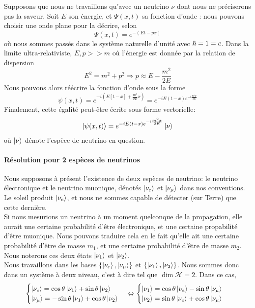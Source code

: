 \documentclass[../notesdecours.tex]{subfiles}
\begin{document}
Supposons que nous ne travaillons qu'avec un neutrino $\nu$ dont nous ne préciserons pas la saveur. Soit $E$ son énergie, et $\Psi(x,t)$ sa fonction d'onde : nous pouvons choisir une onde plane pour la décrire, selon
\begin{equation}
    \Psi(x,t) = e^{-\left(Et-px\right)}
\end{equation}
où nous sommes passés dans le système naturelle d'unité avec $\hbar = 1 = c$. Dans la limite ultra-relativiste, $E,p >> m$ où l'énergie est donnée par la relation de dispersion
\begin{equation}
    E^2 = m^2 + p^2 \Rightarrow p \approx E-\frac{m^2}{2E}
\end{equation}
Nous pouvons alors réécrire la fonction d'onde sous la forme
\begin{equation*}
    \psi(x,t) = e^{-i\left(E\left[t-x\right]+\frac{m^2}{2E}x\right)} = e^{-iE\left(t-x\right)e^{-i\frac{m^2x}{2E}}}
\end{equation*}
Finalement, cette égalité peut-être écrite sous forme vectorielle:
\begin{equation}\label{eq:fonction d'onde}
    \ket{\psi(x,t)} = e^{-iE\left(t-x\right)e^{-i\frac{m^2x}{2E}}}\ket{\nu}
\end{equation}
où $\ket{\nu}$ dénote l'espèce de neutrino en question.
\paragraph{Résolution pour 2 espèces de neutrinos}
Nous supposons à présent l'existence de deux espèces de neutrino: le neutrino électronique et le neutrino muonique, dénotés $\ket{\nu_e}$ et $\ket{\nu_\mu}$ dans nos conventions. Le soleil produit $\ket{\nu_e}$, et nous ne sommes capable de détecter (sur Terre) que cette dernière.\\

Si nous mesurions un neutrino à un moment quelconque de la propagation, elle aurait une certaine probabilité d'être électronique, et une certaine propabilité d'être muonique. Nous pouvons traduire cela en le fait qu'elle ait une certaine probabilité d'être de masse $m_1$, et une certaine probabilité d'être de masse $m_2$. Nous noterons ces deux états $\ket{\nu_1}$ et $\ket{\nu_2}$.\\

Nous travaillons dans les bases $\left\{\ket{\nu_e},\ket{\nu_\mu}\right\}$ et $\left\{\ket{\nu_1},\ket{\nu_2}\right\}$. Nous sommes donc dans un système à deux niveau, c'est à dire tel que $\dim\mathcal{H} = 2$. Dans ce cas,
\begin{equation}
    \begin{cases}
        \ket{\nu_e} = \cos\theta\ket{\nu_1}+\sin\theta\ket{\nu_2}\\
        \ket{\nu_\mu} = -\sin\theta\ket{\nu_1}+\cos\theta\ket{\nu_2}
    \end{cases}
    \Leftrightarrow
    \begin{cases}
        \ket{\nu_1} = \cos\theta\ket{\nu_e}-\sin\theta\ket{\nu_\mu}\\
        \ket{\nu_2} = \sin\theta\ket{\nu_e}+\cos\theta\ket{\nu_\mu}
    \end{cases}
\end{equation}
\end{document}
